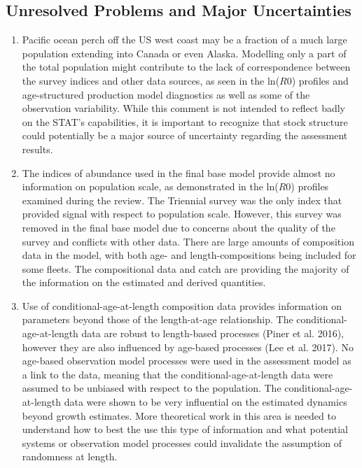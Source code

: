 \documentclass[12pt,]{article}
\begin{document}
\FloatBarrier

\subsection*{Unresolved Problems and Major
Uncertainties}\label{unresolved-problems-and-major-uncertainties}

\begin{enumerate}

\item Pacific ocean perch off the US west coast may be a fraction of a much large population extending into Canada or even Alaska. Modelling only a part of the total population might contribute to the lack of correspondence between the survey indices and other data sources, as seen in the ln($R0$) profiles and age-structured production model diagnostics as well as some of the observation variability. While this comment is not intended to reflect badly on the STAT's capabilities, it is important to recognize that stock structure could potentially be a major source of uncertainty regarding the assessment results.
  
\item The indices of abundance used in the final base model provide almost no information on population scale, as demonstrated in the ln($R0$) profiles examined during the review. The Triennial survey was the only index that provided signal with respect to population scale. However, this survey was removed in the final base model due to concerns about the quality of the survey and conflicts with other data. There are large amounts of composition data in the model, with both age- and length-compositions being included for some fleets. The compositional data and catch are providing the majority of the information on the estimated and derived quantities.

\item Use of conditional-age-at-length composition data provides information on parameters beyond those of the length-at-age relationship. The conditional-age-at-length data are robust to length-based processes (Piner et al. 2016), however they are also influenced by age-based processes (Lee et al. 2017). No age-based observation model processes were used in the assessment model as a link to the data, meaning that the conditional-age-at-length data were assumed to be unbiased with respect to the population. The conditional-age-at-length data were shown to be very influential on the estimated dynamics beyond growth estimates. More theoretical work in this area is needed to understand how to best the use this type of information and what potential systems or observation model processes could invalidate the assumption of randomness at length.

\end{enumerate}
\end{document}
